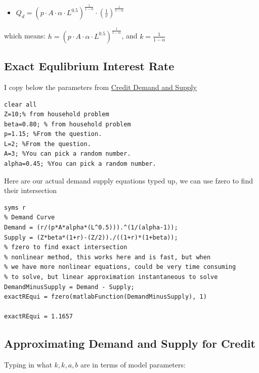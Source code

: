 \documentclass[
]{book}
\providecommand{\tightlist}{%
  \setlength{\itemsep}{0pt}\setlength{\parskip}{0pt}}
\begin{document}
\begin{itemize}
\tightlist
\item
  \(\displaystyle Q_d ={\left(p\cdot A\cdot \alpha \cdot L^{0.5} \right)}^{\frac{1}{1-\alpha }} \cdot {\left(\frac{1}{r}\right)}^{\frac{1}{1-\alpha }}\)
\end{itemize}

which means:
\(h={\left(p\cdot A\cdot \alpha \cdot L^{0.5} \right)}^{\frac{1}{1-\alpha }}\),
and \(k=\frac{1}{1-\alpha }\)

\hypertarget{exact-equlibrium-interest-rate}{%
\subsection{Exact Equlibrium Interest Rate}\label{exact-equlibrium-interest-rate}}

I copy below the parameters from \href{https://fanwangecon.github.io/Math4Econ/derivative_application/K_borrow_firm.html}{Credit Demand and
Supply}

\begin{verbatim}
clear all
Z=10;% from household problem
beta=0.80; % from household problem
p=1.15; %From the question.
L=2; %From the question.
A=3; %You can pick a random number.
alpha=0.45; %You can pick a random number.
\end{verbatim}

Here are our actual demand supply equations typed up, we can use fzero
to find their intersection

\begin{verbatim}
syms r
% Demand Curve
Demand = (r/(p*A*alpha*(L^0.5))).^(1/(alpha-1));
Supply = (Z*beta*(1+r)-(Z/2))./((1+r)*(1+beta));
% fzero to find exact intersection
% nonlinear method, this works here and is fast, but when 
% we have more nonlinear equations, could be very time consuming 
% to solve, but linear approximation instantaneous to solve
DemandMinusSupply = Demand - Supply;
exactREqui = fzero(matlabFunction(DemandMinusSupply), 1)

exactREqui = 1.1657
\end{verbatim}

\hypertarget{approximating-demand-and-supply-for-credit}{%
\subsection{Approximating Demand and Supply for Credit}\label{approximating-demand-and-supply-for-credit}}

Typing in what \(k,k,a,b\) are in terms of model parameters:
\end{document}
